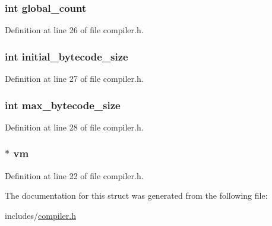 \hypertarget{structcompiler_ade7224f7f710766a20379dd19924b533}{
\subsubsection[{global\+\_\+count}]{\setlength{\rightskip}{0pt plus 5cm}int global\+\_\+count}}\label{structcompiler_ade7224f7f710766a20379dd19924b533}


Definition at line 26 of file compiler.\+h.

\hypertarget{structcompiler_af4bc3176982d6dd4cea51d6f647040ea}{
\subsubsection[{initial\+\_\+bytecode\+\_\+size}]{\setlength{\rightskip}{0pt plus 5cm}int initial\+\_\+bytecode\+\_\+size}}\label{structcompiler_af4bc3176982d6dd4cea51d6f647040ea}


Definition at line 27 of file compiler.\+h.

\hypertarget{structcompiler_aa98dd05a2e85a0bcfa6a97968f86536a}{
\subsubsection[{max\+\_\+bytecode\+\_\+size}]{\setlength{\rightskip}{0pt plus 5cm}int max\+\_\+bytecode\+\_\+size}}\label{structcompiler_aa98dd05a2e85a0bcfa6a97968f86536a}


Definition at line 28 of file compiler.\+h.

\hypertarget{structcompiler_a5a5f893f1b70a8fd8b043428132b4efa}{
\subsubsection[{vm}]{$\ast$ vm}}\label{structcompiler_a5a5f893f1b70a8fd8b043428132b4efa}


Definition at line 22 of file compiler.\+h.



The documentation for this struct was generated from the following file\+:\begin{DoxyCompactItemize}
\item 
includes/\hyperlink{compiler_8h}{compiler.\+h}\end{DoxyCompactItemize}
